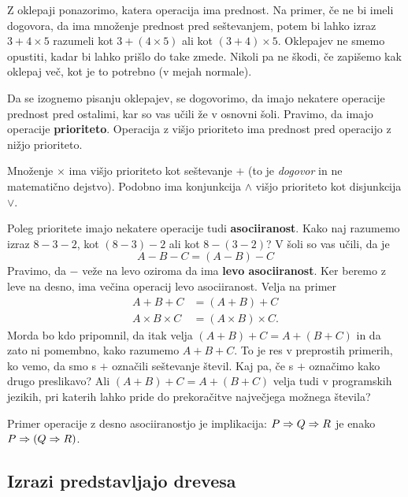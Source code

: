 Z oklepaji ponazorimo, katera operacija ima prednost. Na primer, če ne bi imeli dogovora, da ima množenje prednost pred
seštevanjem, potem bi lahko izraz $3 + 4 \times 5$ razumeli kot $3 + (4 \times 5)$ ali kot $(3 + 4) \times 5$. Oklepajev ne smemo opustiti, kadar bi lahko prišlo do take zmede. Nikoli pa ne škodi, če zapišemo kak oklepaj več, kot je to potrebno (v mejah normale).

Da se izognemo pisanju oklepajev, se dogovorimo, da imajo nekatere operacije prednost pred ostalimi, kar so vas učili že
v osnovni šoli. Pravimo, da imajo operacije \textbf{prioriteto}. Operacija z višjo prioriteto ima prednost pred operacijo z
nižjo prioriteto.

\begin{primer}
  Množenje $\times$ ima višjo prioriteto kot seštevanje $+$ (to je \emph{dogovor} in ne matematično dejstvo).
  Podobno ima konjunkcija $\land$ višjo prioriteto kot disjunkcija $\lor$.
\end{primer}

Poleg prioritete imajo nekatere operacije tudi \textbf{asociiranost}. Kako naj razumemo izraz $8 - 3 - 2$, kot $(8 - 3) - 2$
ali kot $8 - (3 - 2)$? V šoli so vas učili, da je
%
\begin{equation*}
  A - B - C = (A - B) - C
\end{equation*}
%
Pravimo, da $-$ veže na levo oziroma da ima \textbf{levo asociiranost}. Ker beremo z leve na desno, ima večina operacij levo
asociiranost. Velja na primer
%
\begin{align*}
  A + B + C &= (A + B) + C \\
  A \times B \times C &= (A \times B) \times C.
\end{align*}
%
Morda bo kdo pripomnil, da itak velja $(A + B) + C = A + (B + C)$ in da zato ni pomembno, kako razumemo $A + B + C$. To je
res v preprostih primerih, ko vemo, da smo s $+$ označili seštevanje števil. Kaj pa, če s $+$ označimo kako drugo
preslikavo? Ali $(A + B) + C = A + (B + C)$ velja tudi v programskih jezikih, pri katerih lahko pride do prekoračitve
največjega možnega števila?

Primer operacije z desno asociiranostjo je implikacija: $P \Rightarrow Q \Rightarrow R$ je enako $P \Rightarrow (Q \Rightarrow R)$.


\subsection{Izrazi predstavljajo drevesa}

